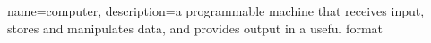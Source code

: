     {name=computer,
     description={a programmable machine that receives input,
                  stores and manipulates data, and provides
                  output in a useful format}
}

